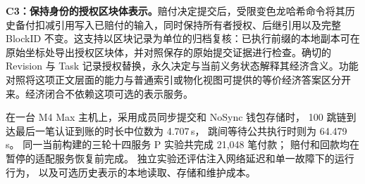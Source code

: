 \noindent\textbf{C3：保持身份的授权区块体表示。}赔付决定提交后，受限变色龙哈希命令将其历史备付扣减引用写入已赔付的输入，同时保持所有者授权、后继引用以及完整 BlockID 不变。这支持以区块记录为单位的归档复核：已执行前缀的本地副本可在原始坐标处导出授权区块体，并对照保存的原始提交证据进行检查。确切的 Revision 与 Task 记录授权替换，永久决定与当前义务状态解释其经济含义。功能对照将这项正文层面的能力与普通索引或物化视图可提供的等价经济答案区分开来。经济闭合不依赖这项可选的表示服务。

在一台 M4 Max 主机上，采用成员同步提交和 NoSync 钱包存储时，
100 跳链到达最后一笔认证到账的时长中位数为 4.707\,s，
跳间等待公共执行时则为 64.479\,s。
同一当前构建的三轮十四服务 P 实验共完成 21,048 笔付款；
赔付和回款均在暂停的适配服务恢复前完成。
独立实验还评估注入网络延迟和单一故障下的运行行为，
以及可选历史表示的本地读取、存储和维护成本。
